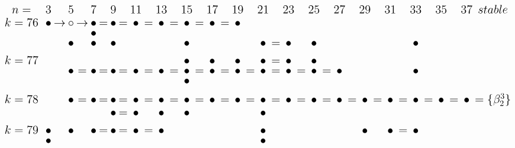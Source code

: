 \documentclass{article}
\begin{document}
\(
\begin{tikzcd}[
nodes={font=\Large,inner sep=0pt},
row sep=0.2cm,
column sep=0.1cm
]
n= && & 3 & & 5 & & 7 & & 9 & & 11 & & 13 & & 15 & & 17 && 19 && 21 && 23 && 25 && 27 && 29 && 31 && 33 && 35 && 37 & stable \\
k=76 &&& \bullet &\rightarrow& \circ &\rightarrow& \bullet &=& \bullet &=& \bullet &=& \bullet &=& \bullet &=& \bullet &=& \bullet \\
&&& && && \bullet && && \\
&&& && \bullet && \bullet && \bullet && && && \bullet && && && \bullet &=& \bullet && \bullet && && && && \bullet && \\ \\
k=77 &&& && && && && && && \bullet && \bullet && \bullet && \bullet &=& \bullet && \bullet \\
&&& && \bullet &=& \bullet &=& \bullet &=& \bullet &=& \bullet &=& \bullet &=& \bullet &=& \bullet &=& \bullet &=& \bullet &=& \bullet &=& \bullet && && && \bullet \\
&&& && && && && && && \bullet && \\ \\
k=78 &&& && \bullet &=& \bullet &=& \bullet &=& \bullet &=& \bullet &=& \bullet &=& \bullet &=& \bullet &=& \bullet &=& \bullet &=& \bullet &=& \bullet &=& \bullet &=& \bullet &=& \bullet &=& \bullet &=& \bullet & = \{\beta_2^3\} \\
&&& && && && \bullet &=& \bullet && \bullet && \bullet && && && \bullet && \\ \\
k=79 &&& \bullet && \bullet && \bullet &=& \bullet &=& \bullet &=& \bullet && && && && \bullet && && && && \bullet && \bullet &=& \bullet \\
&&& \bullet && && && && && && && && && \bullet  \\
\\
\end{tikzcd}
\)
\end{document}
